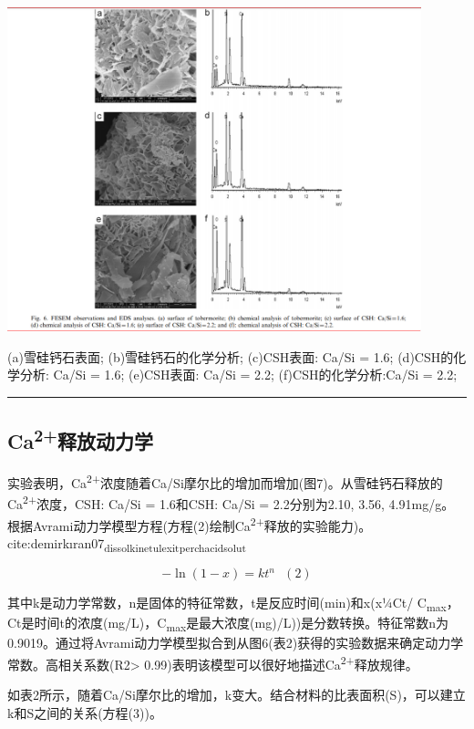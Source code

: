 \documentclass[11pt]{article}
\begin{document}
\includegraphics[width=0.9\textwidth]{fig.6.png}
 \label{tab:title}

(a)雪硅钙石表面;
(b)雪硅钙石的化学分析;
(c)CSH表面: Ca/Si = 1.6;
(d)CSH的化学分析: Ca/Si = 1.6;
(e)CSH表面: Ca/Si = 2.2;
(f)CSH的化学分析:Ca/Si = 2.2;

\noindent\rule{\textwidth}{0.5pt}


\subsection{Ca\textsuperscript{2+}释放动力学}
\label{sec:org0e03bc0}
\setlength{\parindent}{1.0cm}
实验表明，Ca\textsuperscript{2+}浓度随着Ca/Si摩尔比的增加而增加(图7)。从雪硅钙石释放的
Ca\textsuperscript{2+}浓度，CSH: Ca/Si = 1.6和CSH: Ca/Si = 2.2分别为2.10, 3.56, 4.91mg/g。
根据Avrami动力学模型方程(方程(2)绘制Ca\textsuperscript{2+}释放的实验能力)。cite:demirkıran07\textsubscript{dissol}\textsubscript{kinet}\textsubscript{ulexit}\textsubscript{perch}\textsubscript{acid}\textsubscript{solut}
\par

\[-\ln(1-x) = kt^{n} \ \ \ (2)\]

\setlength{\parindent}{1.0cm}
其中k是动力学常数，n是固体的特征常数，t是反应时间(min)和x(x¼Ct/ C\textsubscript{max}，Ct是时间t的浓度(mg/L)，C\textsubscript{max}是最大浓度(mg)/L))是分数转换。特征常数n为0.9019。通过将Avrami动力学模型拟合到从图6(表2)获得的实验数据来确定动力学常数。高相关系数(R2> 0.99)表明该模型可以很好地描述Ca\textsuperscript{2+}释放规律。
\par


\setlength{\parindent}{1.0cm}
如表2所示，随着Ca/Si摩尔比的增加，k变大。结合材料的比表面积(S)，可以建立k和S之间的关系(方程(3))。
\par
\end{document}
